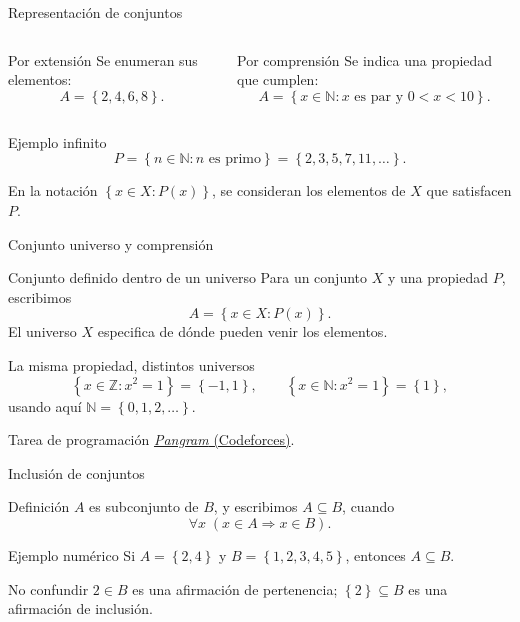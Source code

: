 \documentclass[aspectratio=169,11pt]{beamer}
\newcommand{\NN}{\mathbb{N}}
\newcommand{\ZZ}{\mathbb{Z}}
\newcommand{\Set}[1]{\left\{#1\right\}}
\begin{document}
\begin{frame}{Representación de conjuntos}
    \begin{columns}[T,onlytextwidth]
        \begin{block}{Por extensión}
            Se enumeran sus elementos:
            \[
              A=\Set{2,4,6,8}.
            \]
        \end{block}
        \begin{block}{Por comprensión}
            Se indica una propiedad que cumplen:
            \[
              A=\Set{x\in\NN: x\text{ es par y }0<x<10}.
            \]
        \end{block}
    \end{columns}
    \begin{exampleblock}{Ejemplo infinito}
        \[
          P=\Set{n\in\NN:n\text{ es primo}}=\Set{2,3,5,7,11,\ldots}.
        \]
    \end{exampleblock}
    \small En la notación $\Set{x\in X:P(x)}$, se consideran los elementos de $X$ que satisfacen $P$.
\end{frame}

\begin{frame}{Conjunto universo y comprensión}
    \begin{block}{Conjunto definido dentro de un universo}
        Para un conjunto $X$ y una propiedad $P$, escribimos
        \[
          A=\Set{x\in X:P(x)}.
        \]
        El universo $X$ especifica de dónde pueden venir los elementos.
    \end{block}
    \begin{exampleblock}{La misma propiedad, distintos universos}
        \[
        \Set{x\in\ZZ:x^2=1}=\Set{-1,1},\qquad
        \Set{x\in\NN:x^2=1}=\Set{1},
        \]
        usando aquí $\NN=\Set{0,1,2,\ldots}$.
    \end{exampleblock}
    \begin{exampleblock}{Tarea de programación}
        \href{https://codeforces.com/problemset/problem/520/A}{\textit{Pangram} (Codeforces)}.
    \end{exampleblock}
\end{frame}

\begin{frame}{Inclusión de conjuntos}
    \begin{block}{Definición}
        $A$ es subconjunto de $B$, y escribimos $A\subseteq B$, cuando
        \[
          \forall x\;(x\in A\Longrightarrow x\in B).
        \]
    \end{block}
    \begin{exampleblock}{Ejemplo numérico}
        Si $A=\Set{2,4}$ y $B=\Set{1,2,3,4,5}$, entonces $A\subseteq B$.
    \end{exampleblock}
    \begin{alertblock}{No confundir}
        $2\in B$ es una afirmación de pertenencia; $\Set{2}\subseteq B$ es una afirmación de inclusión.
    \end{alertblock}
\end{frame}
\end{document}
